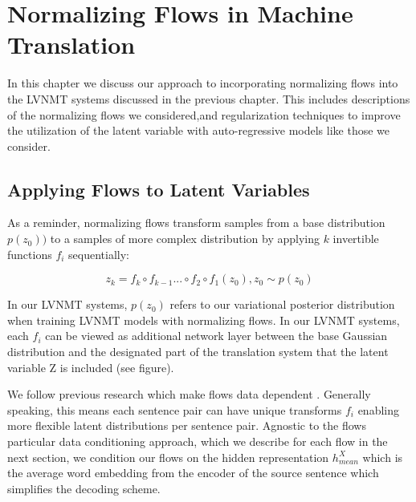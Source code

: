 \chapter{Normalizing Flows in Machine Translation}


In this chapter we discuss our approach to incorporating normalizing flows into the \ac{LVNMT} systems discussed in the previous chapter. This includes descriptions of the normalizing flows we considered,and regularization techniques to improve the utilization of the latent variable with auto-regressive models like those we consider.

\section{Applying Flows to Latent Variables}


As a reminder, normalizing flows transform samples from a base distribution $p(z_{0}))$ to a samples of more complex distribution by applying $k$ invertible functions $f_{i}$ sequentially: 

\begin{equation}
z_{k} = f_{k} \circ f_{k-1} ... \circ f_{2} \circ f_{1}(z_{0}) , z_{0} \sim p(z_{0})
\end{equation}

In our \ac{LVNMT} systems, $p(z_{0})$ refers to our variational posterior distribution when training \ac{LVNMT} models with normalizing flows. In our \ac{LVNMT} systems, each $f_{i}$ can be viewed as additional network layer between the base Gaussian distribution and the designated part of the translation system that the latent variable Z is included (see figure).

We follow previous research which make flows data dependent \cite{rezende2015VIwithNF,Berg2018SylvesterNF,kingma2016IAF,tomczak2016Householder}. Generally speaking, this means each sentence pair can have unique transforms $f_{i}$  enabling more flexible latent distributions per sentence pair.  Agnostic to the flows particular data conditioning approach, which we describe for each flow in the next section, we condition our flows on the hidden representation $h_{mean}^{X}$ which is the average word embedding from the encoder of the source sentence which simplifies the decoding scheme.

